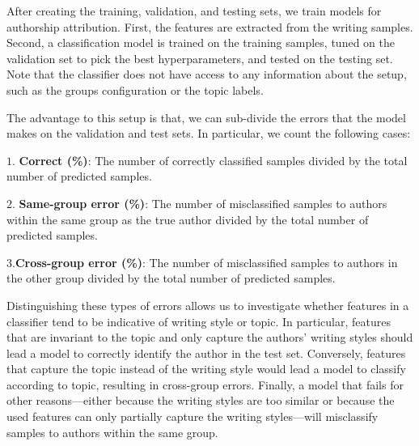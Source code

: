 \documentclass[11pt]{article}
\begin{document}
After creating the training, validation, and testing sets, we train models for authorship attribution. First, the features are extracted from the writing samples. Second, a classification model is trained on the training samples, tuned on the validation set to pick the best hyperparameters, and tested on the testing set. Note that the classifier does not have access to any information about the setup, such as the groups configuration or the topic labels. 

The advantage to this setup is that, we can sub-divide the errors that the model makes on the validation and test sets. In particular, we count the following cases:

\noindent$1.$ \textbf{Correct (\%)}: The number of correctly classified samples divided by the total number of predicted samples.

\noindent$2.$ \textbf{Same-group error (\%)}: The number of misclassified samples to authors within the same group as the true author divided by the total number of predicted samples.

\noindent$3.$\textbf{Cross-group error (\%)}: The number of misclassified samples to authors in the other group divided by the total number of predicted samples.

Distinguishing these types of errors allows us to investigate whether features in a classifier tend to be indicative of writing style or topic. In particular, features that are invariant to the topic and only capture the authors' writing styles should lead a model to correctly identify the author in the test set. Conversely, features that capture the topic instead of the writing style would lead a model to classify according to topic, resulting in cross-group errors. Finally, a model that fails for other reasons---either because the writing styles are too similar or because the used features can only partially capture the writing styles---will misclassify samples to authors within the same group.

\end{document}
